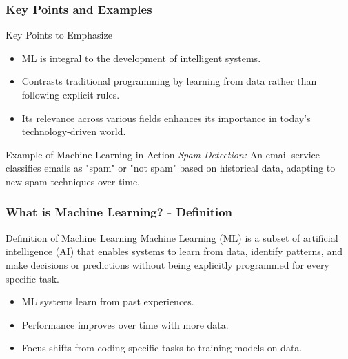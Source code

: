 \documentclass[aspectratio=169]{beamer}
\begin{document}
\begin{frame}[fragile]
    \frametitle{Key Points and Examples}
    \begin{block}{Key Points to Emphasize}
        \begin{itemize}
            \item ML is integral to the development of intelligent systems.
            \item Contrasts traditional programming by learning from data rather than following explicit rules.
            \item Its relevance across various fields enhances its importance in today's technology-driven world.
        \end{itemize}
    \end{block}
    
    \begin{block}{Example of Machine Learning in Action}
        \textit{Spam Detection:} An email service classifies emails as "spam" or "not spam" based on historical data, adapting to new spam techniques over time.
    \end{block}
\end{frame}

\begin{frame}[fragile]
    \frametitle{What is Machine Learning? - Definition}
    \begin{block}{Definition of Machine Learning}
        Machine Learning (ML) is a subset of artificial intelligence (AI) that enables systems to learn from data, identify patterns, and make decisions or predictions without being explicitly programmed for every specific task.
    \end{block}
    \begin{itemize}
        \item ML systems learn from past experiences.
        \item Performance improves over time with more data.
        \item Focus shifts from coding specific tasks to training models on data.
    \end{itemize}
\end{frame}
\end{document}
